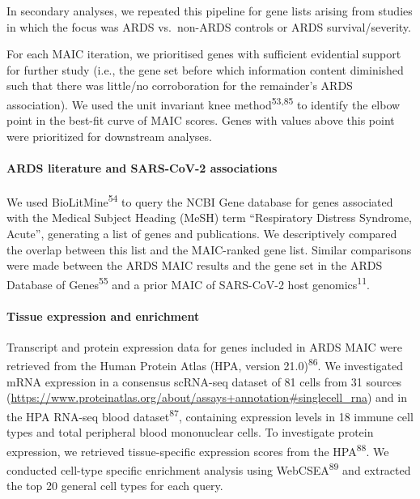 \documentclass[
  11,
  a4paper,
]{article}
\let\oldparagraph\paragraph
\renewcommand{\paragraph}[1]{\oldparagraph{#1}\mbox{}}
\begin{document}
In secondary analyses, we repeated this pipeline for gene lists arising
from studies in which the focus was ARDS vs.~non-ARDS controls or ARDS
survival/severity.

For each MAIC iteration, we prioritised genes with sufficient evidential
support for further study (i.e., the gene set before which information
content diminished such that there was little/no corroboration for the
remainder's ARDS association). We used the unit invariant knee
method\textsuperscript{53,85} to identify the elbow point in the
best-fit curve of MAIC scores. Genes with values above this point were
prioritized for downstream analyses.

\paragraph{ARDS literature and SARS-CoV-2
associations}\label{ards-literature-and-sars-cov-2-associations}

We used BioLitMine\textsuperscript{54} to query the NCBI Gene database
for genes associated with the Medical Subject Heading (MeSH) term
``Respiratory Distress Syndrome, Acute'', generating a list of genes and
publications. We descriptively compared the overlap between this list
and the MAIC-ranked gene list. Similar comparisons were made between the
ARDS MAIC results and the gene set in the ARDS Database of
Genes\textsuperscript{55} and a prior MAIC of SARS-CoV-2 host
genomics\textsuperscript{11}.

\paragraph{Tissue expression and
enrichment}\label{tissue-expression-and-enrichment}

Transcript and protein expression data for genes included in ARDS MAIC
were retrieved from the Human Protein Atlas (HPA, version
21.0)\textsuperscript{86}. We investigated mRNA expression in a
consensus scRNA-seq dataset of 81 cells from 31 sources
(\url{https://www.proteinatlas.org/about/assays+annotation\#singlecell_rna})
and in the HPA RNA-seq blood dataset\textsuperscript{87}, containing
expression levels in 18 immune cell types and total peripheral blood
mononuclear cells. To investigate protein expression, we retrieved
tissue-specific expression scores from the HPA\textsuperscript{88}. We
conducted cell-type specific enrichment analysis using
WebCSEA\textsuperscript{89} and extracted the top 20 general cell types
for each query.
\end{document}
